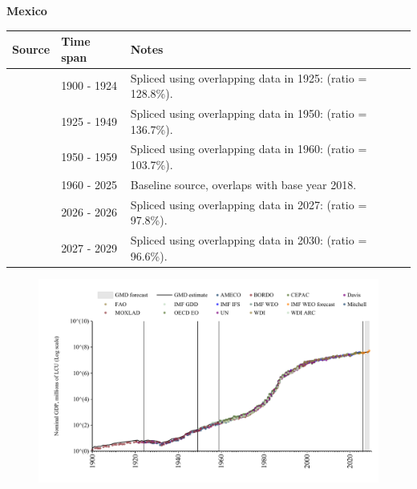 \documentclass[12pt,a4paper,landscape]{article}
\begin{document}
\begin{adjustbox}{max totalsize={\paperwidth}{\paperheight},center}
\begin{minipage}[t][\textheight][t]{\textwidth}
\vspace*{0.5cm}
{}
\begin{center}
{\Large\bfseries Mexico}
\end{center}
\vspace{0.5cm}
\begin{table}[H]
\centering
\small
\begin{tabular}{|l|l|l|}
\hline
\textbf{Source} & \textbf{Time span} & \textbf{Notes} \\
\hline
\rowcolor{white}\cite{MOXLAD}& 1900 - 1924 &Spliced using overlapping data in 1925: (ratio = 128.8\%).\\
\rowcolor{lightgray}\cite{Mitchell}& 1925 - 1949 &Spliced using overlapping data in 1950: (ratio = 136.7\%).\\
\rowcolor{white}\cite{IMF_GDD}& 1950 - 1959 &Spliced using overlapping data in 1960: (ratio = 103.7\%).\\
\rowcolor{lightgray}\cite{OECD_EO}& 1960 - 2025 &Baseline source, overlaps with base year 2018.\\
\rowcolor{white}\cite{AMECO}& 2026 - 2026 &Spliced using overlapping data in 2027: (ratio = 97.8\%).\\
\rowcolor{lightgray}\cite{IMF_WEO_forecast}& 2027 - 2029 &Spliced using overlapping data in 2030: (ratio = 96.6\%).\\
\hline
\end{tabular}
\end{table}
\begin{figure}[H]
\centering
\includegraphics[width=\textwidth,height=0.6\textheight,keepaspectratio]{graphs/MEX_nGDP.pdf}
\end{figure}
\end{minipage}
\end{adjustbox}
\end{document}
